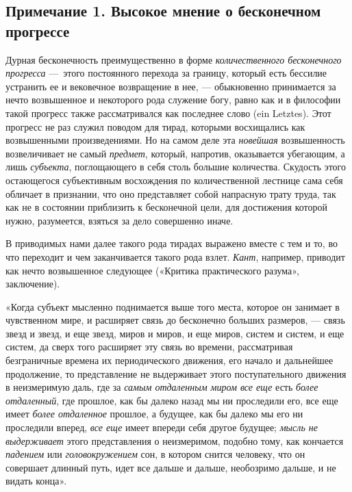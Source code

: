 {\subsection*{Примечание 1. Высокое мнение о бесконечном прогрессе}

Дурная бесконечность преимущественно в форме
{\em количественного бесконечного прогресса} —~этого
постоянного перехода за границу, который есть бессилие устранить ее и
вековечное возвращение в нее, — обыкновенно принимается за нечто
возвышенное и некоторого рода служение богу, равно как и в философии такой
прогресс также рассматривался как последнее слово (ein Letztes). Этот
прогресс не раз служил поводом для тирад, которыми восхищались как
возвышенными произведениями. Но на самом деле эта
{\em новейшая} возвышенность возвеличивает не самый
{\em предмет}, который, напротив, оказывается
убегающим, а лишь {\em субъекта}, поглощающего в себя
столь большие количества. Скудость этого остающегося субъективным
восхождения по количественной лестнице сама себя обличает в признании, что
оно представляет собой напрасную трату труда, так как не в состоянии
приблизить к бесконечной цели, для достижения которой нужно, разумеется,
взяться за дело совершенно иначе.

В приводимых нами далее такого рода тирадах выражено вместе с тем и то, во
что переходит и чем заканчивается такого рода взлет.
{\em Кант}, например, приводит как нечто возвышенное
следующее («Критика практического разума», заключение).

«Когда субъект мысленно поднимается выше того места, которое он занимает в
чувственном мире, и расширяет связь до бесконечно больших размеров, — связь
звезд и звезд, и еще звезд, миров и миров, и еще миров, систем и систем, и
еще систем, да сверх того расширяет эту связь во времени, рассматривая
безграничные времена их периодического движения, его начало и дальнейшее
продолжение, то представление не выдерживает этого поступательного движения
в неизмеримую даль, где за {\em самым отдаленным миром
все еще} есть {\em более отдаленный}, где прошлое, как
бы далеко назад мы ни проследили его, все еще имеет
{\em более отдаленное} прошлое, а будущее, как бы
далеко мы его ни проследили вперед, {\em все еще} имеет
впереди себя другое будущее; {\em мысль не выдерживает}
этого представления о неизмеримом, подобно тому, как кончается
{\em падением} или
{\em головокружением} сон, в котором снится человеку,
что он совершает длинный путь, идет все дальше и дальше, необозримо дальше,
и не видать конца».

}
